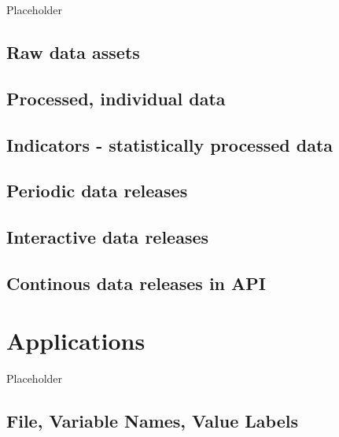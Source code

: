 \documentclass[
  fontsize=13pt,
  english,
  a4paper,
  openany, a4paper, oneside]{article}
\begin{document}
Placeholder

\hypertarget{dta-raw}{%
\subsection{Raw data assets}\label{dta-raw}}

\hypertarget{processed-individual-data}{%
\subsection{Processed, individual data}\label{processed-individual-data}}

\hypertarget{indicators---statistically-processed-data}{%
\subsection{Indicators - statistically processed data}\label{indicators---statistically-processed-data}}

\hypertarget{periodic-data-releases}{%
\subsection{Periodic data releases}\label{periodic-data-releases}}

\hypertarget{interactive-data-releases}{%
\subsection{Interactive data releases}\label{interactive-data-releases}}

\hypertarget{continous-data-releases-in-api}{%
\subsection{Continous data releases in API}\label{continous-data-releases-in-api}}

\hypertarget{applications}{%
\section{Applications}\label{applications}}

Placeholder

\hypertarget{file-variable-names-value-labels}{%
\subsection{File, Variable Names, Value Labels}\label{file-variable-names-value-labels}}
\end{document}
